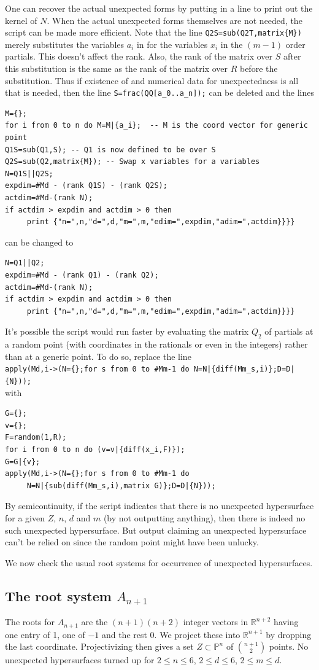\documentclass[12pt]{amsart}
\numberwithin{equation}{section}
\theoremstyle{definition}
\newcommand{\RR}{ \ensuremath{\mathbb{R}}}
\newcommand{\PP}{ \ensuremath{\mathbb{P}}}
\begin{document}
One can recover the actual unexpected forms by putting in a line to print out the kernel of $N$.
When the actual unexpected forms themselves are not needed,
the script can be made more efficient. Note that the line \verb!Q2S=sub(Q2T,matrix{M})!
merely substitutes the variables $a_i$ in for the variables $x_i$ in the $(m-1)$ order partials.
This doesn't affect the rank. Also, the rank of the matrix over $S$ after this substitution
is the same as the rank of the matrix over $R$ before the substitution.
Thus if existence of and numerical data for unexpectedness is all that is needed,
then the line \verb!S=frac(QQ[a_0..a_n]);! can be deleted and the lines
\begin{verbatim}
M={};
for i from 0 to n do M=M|{a_i};  -- M is the coord vector for generic point
Q1S=sub(Q1,S); -- Q1 is now defined to be over S
Q2S=sub(Q2,matrix{M}); -- Swap x variables for a variables
N=Q1S||Q2S;  
expdim=#Md - (rank Q1S) - (rank Q2S);
actdim=#Md-(rank N);
if actdim > expdim and actdim > 0 then 
     print {"n=",n,"d=",d,"m=",m,"edim=",expdim,"adim=",actdim}}}}
\end{verbatim}
can be changed to
\begin{verbatim}
N=Q1||Q2;
expdim=#Md - (rank Q1) - (rank Q2);
actdim=#Md-(rank N);
if actdim > expdim and actdim > 0 then 
     print {"n=",n,"d=",d,"m=",m,"edim=",expdim,"adim=",actdim}}}}
\end{verbatim}
It's possible the script would run faster by evaluating the matrix $Q_2$ of partials at a random point
(with coordinates in the rationals or even in the integers)
rather than at a generic point. To do so, replace the line\\
\verb!apply(Md,i->(N={};for s from 0 to #Mm-1 do N=N|{diff(Mm_s,i)};D=D|{N}));!\\
with
\begin{verbatim}
G={};
v={};
F=random(1,R);
for i from 0 to n do (v=v|{diff(x_i,F)});
G=G|{v};
apply(Md,i->(N={};for s from 0 to #Mm-1 do 
     N=N|{sub(diff(Mm_s,i),matrix G)};D=D|{N}));
\end{verbatim}
By semicontinuity, if the script indicates that there is no
unexpected hypersurface for a given $Z$, $n$, $d$ and $m$ (by not outputting anything),
then there is indeed no such unexpected hypersurface. But output claiming
an unexpected hypersurface can't be relied on since the random point might
have been unlucky.

We now check the usual root systems for occurrence of unexpected hypersurfaces.

\subsection{The root system \texorpdfstring{$A_{n+1}$}{A(n+1)}}
The roots for $A_{n+1}$ are the $(n+1)(n+2)$ integer vectors in $\RR^{n+2}$ having one entry of 1, one of $-1$ and the rest 0.
We project these into $\RR^{n+1}$ by dropping the last coordinate. Projectivizing then gives a set $Z\subset\PP^n$
of $\binom{n+1}{2}$ points. No unexpected hypersurfaces turned up for 
$2\leq n\leq6$, $2\leq d\leq6$, $2\leq m\leq d$.
\end{document}
